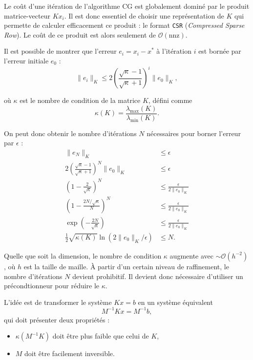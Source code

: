 \documentclass[12pt]{article}
\begin{document}
Le coût d'une itération de l'algorithme CG est globalement dominé par le
produit matrice-vecteur $Kx_i$. Il est donc essentiel de choisir une
représentation de $K$ qui permette de calculer efficacement ce
produit : le format \texttt{CSR} (\textit{Compressed Sparse Row}). 
Le coût de ce produit est alors seulement de $\mathcal{O}(\text{nnz})$.

Il est possible de montrer que l'erreur $e_i = x_i - x^*$ à l'itération $i$ 
est bornée par l'erreur initiale $e_0$ :
\begin{equation}
    \|e_i\|_K \leq 2 \left(\frac{\sqrt{\kappa} - 1}{\sqrt{\kappa}+1}\right)^i \|e_0\|_K,
\end{equation}

où $\kappa$ est le nombre de condition de la matrice $K$, défini comme 
\begin{equation}
    \kappa(K) = \frac{\lambda_{\max}(K)}{\lambda_{\min}(K)}.
\end{equation}

On peut donc obtenir le nombre d'itérations $N$ nécessaires pour borner 
l'erreur par $\epsilon$ :
\begin{equation}
    \begin{aligned}
        \|e_N\|_K &\leq \epsilon\\
        2 \left(\frac{\sqrt{\kappa} - 1}{\sqrt{\kappa}+1}\right)^N \|e_0\|_K &\leq \epsilon\\
        \left(1 - \frac{2}{\sqrt{\kappa}}\right)^N &\leq \frac{\epsilon}{2\|e_0\|_K}\\
        \left(1 - \frac{2N/\sqrt{\kappa}}{N}\right)^N &\leq \frac{\epsilon}{2\|e_0\|_K}\\
        \exp\left(-\frac{2N}{\sqrt{\kappa}}\right) &\leq \frac{\epsilon}{2\|e_0\|_K}\\
        \frac{1}{2} \sqrt{\kappa(K)} \ln\left(2\|e_0\|_K / \epsilon\right) &\leq N.
    \end{aligned}
\end{equation}

Quelle que soit la dimension, le nombre de condition $\kappa$ augmente avec 
$\sim \mathcal{O}(h^{-2})$, où $h$ est la taille de maille.
À partir d'un certain niveau de raffinement, le nombre d'itérations $N$ 
devient prohibitif. Il devient donc nécessaire d'utiliser un précondtionneur 
pour réduire le $\kappa$.

L'idée est de transformer le système $Kx = b$ en un système équivalent 
\begin{equation}
    M^{-1} K x = M^{-1} b,
\end{equation}
qui doit présenter deux propriétés :
\begin{itemize}
    \setlength{\itemsep}{0pt}
    \item $\kappa(M^{-1} K)$ doit être plus faible que celui
    de $K$,
    \item $M$ doit être facilement inversible.
\end{itemize}
\end{document}
